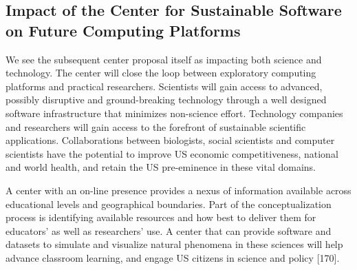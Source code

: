 \subsection{Impact of the Center for Sustainable Software on Future Computing Platforms}
We see the
subsequent center proposal itself as impacting both science and technology. The center will close
the loop between exploratory computing platforms and practical researchers. Scientists will gain
access to advanced, possibly disruptive and ground-breaking technology through a well designed
software infrastructure that minimizes non-science effort. Technology companies and researchers
will gain access to the forefront of sustainable scientific applications. Collaborations between
biologists, social scientists and computer scientists have the potential to improve US economic
competitiveness, national and world health, and retain the US pre-eminence in these vital domains.

A center with an on-line presence provides a nexus of information available across educational
levels and geographical boundaries. Part of the conceptualization process is identifying available
resources and how best to deliver them for educators’ as well as researchers’ use. A center that can
provide software and datasets to simulate and visualize natural phenomena in these sciences will
help advance classroom learning, and engage US citizens in science and policy [170].
